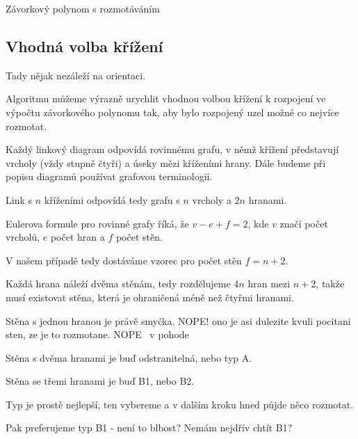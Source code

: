 \begin{algorithm}[H]

\DontPrintSemicolon

%




\caption{Závorkový polynom s rozmotáváním} 
\end{algorithm}


\subsection{Vhodná volba křížení}
Tady nějak nezáleží na orientaci.

Algoritmu můžeme výrazně urychlit vhodnou volbou křížení k rozpojení ve výpočtu závorkového polynomu tak, aby bylo rozpojený uzel možné co nejvíce rozmotat.

Každý linkový diagram odpovídá rovinnému grafu, v němž křížení představují vrcholy (vždy stupně čtyři) a úseky mězi kříženími hrany. Dále budeme při popisu diagramů používat grafovou terminologii.

Link s $n$ kříženími odpovídá tedy grafu s $n$ vrcholy a 2$n$ hranami.

Eulerova formule pro rovinné grafy říká, že $v - e +f = 2$, kde $v$ značí počet vrcholů, $e$ počet hran a $f$ počet stěn.

V našem případě tedy dostáváme vzorec pro počet stěn $f = n+2$.

Každá hrana náleží dvěma stěnám, tedy rozdělujeme 4$n$ hran mezi $n+2$, takže musí existovat stěna, která je ohraničená méně než čtyřmi hranami.

Stěna s jednou hranou je právě smyčka. NOPE! ono je asi dulezite kvuli pocitani sten, ze je to rozmotane. NOPE~ v pohode

Stěna s dvěma hranami je buď odstranitelná, nebo typ A.

Stěna se třemi hranami je buď B1, nebo B2.

Typ je prostě nejlepší, ten vybereme a v dalším kroku hned půjde něco rozmotat.

Pak preferujeme typ B1 - není to blbost? Nemám nejdřív chtít B1?

